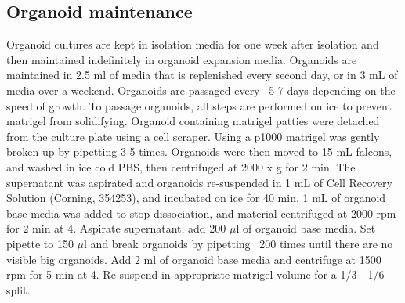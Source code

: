 \documentclass[a4paper]{report}
\begin{document}
\subsection{Organoid maintenance}
Organoid cultures are kept in isolation media for one week after isolation and then maintained indefinitely in organoid expansion media. Organoids are maintained in 2.5 ml of media that is replenished every second day, or in 3 mL of media over a weekend. Organoids are passaged every ~5-7 days depending on the speed of growth.
\vspace{2mm}\newline To passage organoids, all steps are performed on ice to prevent matrigel from solidifying. Organoid containing matrigel patties were detached from the culture plate using a cell scraper. Using a p1000 matrigel was gently broken up by pipetting 3-5 times. Organoids were then moved to 15 mL falcons, and washed in ice cold PBS, then centrifuged at 2000 x g for 2 min. The supernatant was aspirated and organoids re-suspended in 1 mL of Cell Recovery Solution (Corning, 354253), and incubated on ice for 40 min. 1 mL of organoid base media was added to stop dissociation, and material centrifuged at 2000 rpm for 2 min at 4. Aspirate supernatant, add 200 $\mu$l of organoid base media. Set pipette to 150 $\mu$l and break organoids by pipetting ~200 times until there are no visible big organoids. Add 2 ml of organoid base media and centrifuge at 1500 rpm for 5 min at 4. Re-suspend in appropriate matrigel volume for a 1/3 - 1/6 split. 
\end{document}
